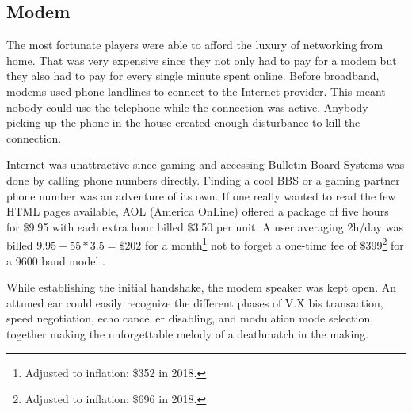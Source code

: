 \subsection{Modem}
The most fortunate players were able to afford the luxury of networking from home. That was very expensive since they not only had to pay for a modem but they also had to pay for every single minute spent online. Before broadband, modems used phone landlines to connect to the Internet provider. This meant nobody could use the telephone while the connection was active. Anybody picking up the phone in the house created enough disturbance to kill the connection.\\
\par
Internet was unattractive since gaming and accessing Bulletin Board Systems was done by calling phone numbers directly. Finding a cool BBS or a gaming partner phone number was an adventure of its own. If one really wanted to read the few HTML pages available, AOL (America OnLine) offered a package of five hours for \$9.95 with each extra hour billed \$3.50 per unit. A user averaging 2h/day was billed $9.95 + 55 * 3.5 = \$202 $ for a month\footnote{Adjusted to inflation: \$352 in 2018.} not to forget a one-time fee of \$399\footnote{Adjusted to inflation: \$696 in 2018.} for a 9600 baud model .\\
\par
{}

 While establishing the initial handshake, the modem speaker was kept open. An attuned ear could easily recognize the different phases of V.X bis transaction, speed negotiation, echo canceller disabling, and modulation mode selection, together making the unforgettable melody of a deathmatch in the making.\\
 \par 
{}
\par
 
